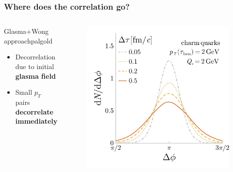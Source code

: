 \documentclass[aspectratio=169,11pt,usenames,dvipsnames]{beamer}
\begin{document}

\begin{frame}[noframenumbering]
    \frametitle{Where does the correlation go?}
    \vspace{-15pt}
    {\begin{center}
        \begin{columns}[onlytextwidth,t]
           \begin{center}
                \begin{custombox2transp}{\normalsize{} Glasma+Wong approach}{palgold}
                    \small
                    \begin{varwidth}{0.93\textwidth}
                    \begin{itemize}\itemsep0em 
                        \itemsep0em
                        \footnotesize
                        \item{} Decorrelation due to initial {\bfseries\color{palgold}glasma field}
                        \item{} Small $p_T$ pairs {\bfseries\color{palgold}decorrelate immediately} 
                    \end{itemize}
                    \end{varwidth}
                \end{custombox2transp}
            \end{center}
            \vspace{-15pt}
           \begin{figure}
                \centering
                \includegraphics[width=0.7\columnwidth]{images/final_dNdphi_tau_dep_charm_v2.png}

\end{figure}
\end{columns}
\end{center}}
\end{frame}
\end{document}
